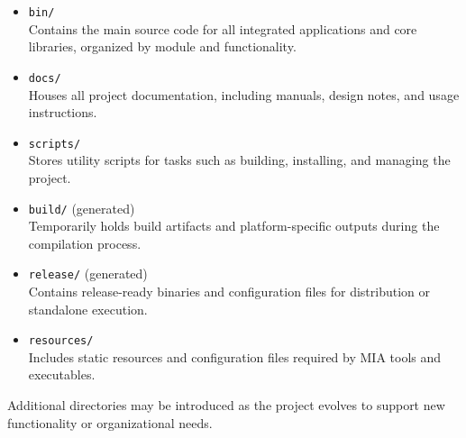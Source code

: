 \begin{itemize}\itemsep0em
	\item \texttt{bin/} \hfill \\ 
	Contains the main source code for all integrated applications and core libraries, organized by module and functionality.
	
	\item \texttt{docs/} \hfill \\ 
	Houses all project documentation, including manuals, design notes, and usage instructions.
	
	\item \texttt{scripts/} \hfill \\ 
	Stores utility scripts for tasks such as building, installing, and managing the project.
	
	\item \texttt{build/} (generated) \hfill \\ 
	Temporarily holds build artifacts and platform-specific outputs during the compilation process.
	
	\item \texttt{release/} (generated) \hfill \\ 
	Contains release-ready binaries and configuration files for distribution or standalone execution.
	
	\item \texttt{resources/} \hfill \\ 
	Includes static resources and configuration files required by MIA tools and executables.
\end{itemize}

Additional directories may be introduced as the project evolves to support new functionality or organizational needs.
